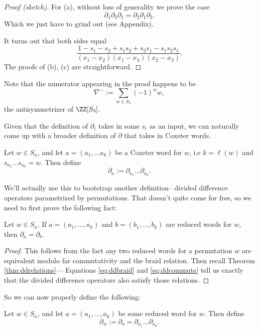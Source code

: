 \documentclass{article}
\begin{document}
\begin{proof}[Proof (sketch)]
    For (a), without loss of generality we prove the case
    \[
        \partial_1\partial_2\partial_1 = \partial_2\partial_1\partial_2.
    \]
    Which we just have to grind out (see Appendix).

    It turns out that both sides equal
    \[
        \frac{1 - s_1 - s_2 + s_1s_2 + s_2s_1 - s_1s_2s_1}{(x_1-x_2)(x_1-x_3)(x_2-x_3)}.
    \]
    The proofs of (b), (c) are straightforward.
\end{proof}

    Note that the numerator appearing in the proof happens to be
    \[
        \nabla^{-} := \sum_{w\in S_3}(-1)^w w,
    \]
    the antisymmetrizer of $\ZZ[S_3]$.

Given that the definition of $\partial_i$ takes in some $s_i$ as an input, we can naturally come up with a broader definition of $\partial$ that takes in Coxeter words.

\begin{definition}\label{def:ddword}
    Let $w \in S_n$, and let $a = (a_1, \ldots a_k)$ be a Coxeter word for $w$, i.e $k = \ell(w)$ and $s_{a_1}\ldots s_{a_k} = w$. Then define
    \[
        \partial_a := \partial_{a_1}\ldots\partial_{a_k}.
    \]
\end{definition}

We'll actually use this to bootstrap another definition-- divided difference operators parametrized by permutations. That doesn't quite come for free, so we need to first prove the following fact:

\begin{theorem}\label{thm:ddreducedwordequiv}
    Let $w \in S_n$.
    If $a=(a_1,\ldots,a_k)$ and $b=(b_1,\ldots,b_k)$ are reduced words for $w$, then $\partial_a = \partial_b$.
\end{theorem}

\begin{proof}
    This follows from the fact any two reduced words for a permutation $w$ are equivalent modulo far commutativity and the braid relation. 
    Then recall Theorem \ref{thm:ddrelations}--- Equations \ref{eq:ddbraid} and \ref{eq:ddcommute} tell us exactly that the divided difference operators also satisfy those relations.
\end{proof}

So we can now properly define the following:

\begin{theorem}
    Let $w \in S_n$, and let $a=(a_1,\ldots,a_k)$ be some reduced word for $w$.
    Then define
    \[
        \partial_w := \partial_a = \partial_{a_1}\ldots\partial_{a_k}.
    \]
\end{theorem}
\end{document}
